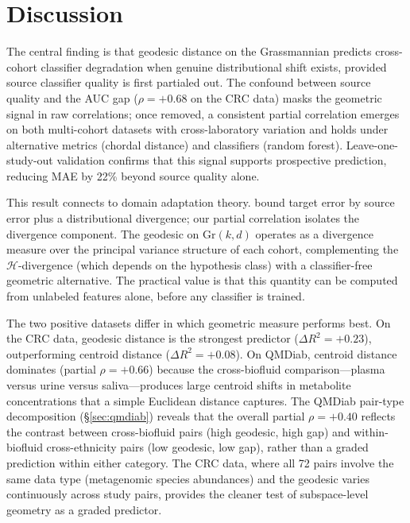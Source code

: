 \documentclass{article}
\begin{document}
\section{Discussion}
\label{sec:discussion}

The central finding is that geodesic distance on the Grassmannian predicts cross-cohort classifier degradation when genuine distributional shift exists, provided source classifier quality is first partialed out. The confound between source quality and the AUC gap ($\rho = +0.68$ on the CRC data) masks the geometric signal in raw correlations; once removed, a consistent partial correlation emerges on both multi-cohort datasets with cross-laboratory variation and holds under alternative metrics (chordal distance) and classifiers (random forest). Leave-one-study-out validation confirms that this signal supports prospective prediction, reducing MAE by 22\% beyond source quality alone.

This result connects to domain adaptation theory. \citet{bendavid2010theory} bound target error by source error plus a distributional divergence; our partial correlation isolates the divergence component. The geodesic on $\mathrm{Gr}(k, d)$ operates as a divergence measure over the principal variance structure of each cohort, complementing the $\mathcal{H}$-divergence (which depends on the hypothesis class) with a classifier-free geometric alternative. The practical value is that this quantity can be computed from unlabeled features alone, before any classifier is trained.

The two positive datasets differ in which geometric measure performs best. On the CRC data, geodesic distance is the strongest predictor ($\Delta R^2 = +0.23$), outperforming centroid distance ($\Delta R^2 = +0.08$). On QMDiab, centroid distance dominates (partial $\rho = +0.66$) because the cross-biofluid comparison---plasma versus urine versus saliva---produces large centroid shifts in metabolite concentrations that a simple Euclidean distance captures. The QMDiab pair-type decomposition (\S\ref{sec:qmdiab}) reveals that the overall partial $\rho = +0.40$ reflects the contrast between cross-biofluid pairs (high geodesic, high gap) and within-biofluid cross-ethnicity pairs (low geodesic, low gap), rather than a graded prediction within either category. The CRC data, where all 72 pairs involve the same data type (metagenomic species abundances) and the geodesic varies continuously across study pairs, provides the cleaner test of subspace-level geometry as a graded predictor.
\end{document}
